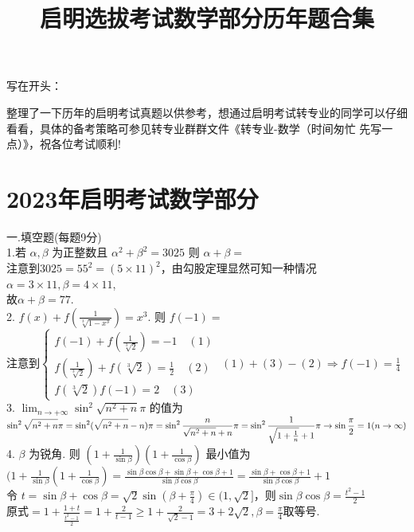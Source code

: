 \documentclass[a4paper,11pt,UTF8]{article}
\title{启明选拔考试数学部分历年题合集}
\author{}
\begin{document}
\maketitle
\noindent
写在开头：

整理了一下历年的启明考试真题以供参考，想通过启明考试转专业的同学可以仔细看看，具体的备考策略可参见转专业群群文件《转专业-数学（时间匆忙 先写一点）》，祝各位考试顺利!
\section*{2023年启明考试数学部分}
\noindent
一.填空题(每题9分)\\
1.若 $\alpha, \beta$ 为正整数且 $\alpha^2+\beta^2=3025$ 则 $\alpha+\beta=$\\
注意到$3025=55^2=(5\times11)^2$，由勾股定理显然可知一种情况$\alpha=3\times11,\beta=4\times11$,\\
故$\alpha+\beta=77$.\\
2. $\displaystyle f(x)+f\left(\frac{1}{\sqrt[3]{1-x^3}}\right)=x^3$. 则 $f(-1)=$\\
注意到$\begin{cases}
	\displaystyle f(-1)+f(\frac{1}{\sqrt[3]{2}})=-1\quad(1)\\
	\displaystyle f(\frac{1}{\sqrt[3]{2}})+f(\sqrt[3]{2})=\frac{1}{2}\quad(2)\\
	\displaystyle f(\sqrt[3]{2})f(-1)=2\quad(3)
\end{cases}$
$\displaystyle(1)+(3)-(2)\Rightarrow f(-1)=\frac{1}{4}$\\
3. $\displaystyle \lim _{n \rightarrow+\infty} \sin ^2\sqrt{n^2+n}\pi$ 的值为\\
$\displaystyle\sin ^2\sqrt{n^2+n} \pi=\sin ^2(\sqrt{n^2+n}-n)\pi=\sin ^2\frac{n}{\sqrt{n^2+n}+n}\pi\\
=\sin ^2\frac{1}{\sqrt{1+\frac{1}{n}}+1}\pi\rightarrow\sin\frac{\pi}{2}=1(n\to\infty)$\\
4. $\beta$ 为锐角. 则 $\displaystyle\left(1+\frac{1}{\sin \beta}\right)\left(1+\frac{1}{\cos \beta}\right)$ 最小值为\\
$\displaystyle(1+\frac{1}{\sin \beta}(1+\frac{1}{\cos \beta})=\frac{\sin\beta\cos\beta+\sin\beta+\cos\beta+1}{\sin\beta\cos\beta}=\frac{\sin\beta+\cos\beta+1}{\sin\beta\cos\beta}+1$\\
令 $\displaystyle t=\sin\beta+\cos\beta=\sqrt{2}\sin(\beta+\frac{\pi}{4})\in(1,\sqrt{2}]$，则$\displaystyle\sin\beta\cos\beta=\frac{t^2-1}{2}$\\
原式$\displaystyle=1+\frac{1+t}{\displaystyle\frac{t^2-1}{2}}=1+\frac{2}{t-1}\geq1+\frac{2}{\sqrt{2}-1}= 3+2\sqrt{2},\beta=\frac{\pi}{4}$取等号.\\
\end{document}

